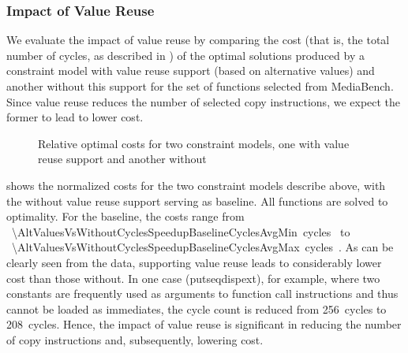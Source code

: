 \subsubsection{Impact of Value Reuse}

We evaluate the impact of \gls{value reuse} by comparing the cost (that is, the
total number of cycles, as described in ) of
the optimal \glspl{solution} produced by a \gls{constraint model} with
\gls{value reuse} support (based on \glspl{alternative value}) and another
without this support for the set of \glspl{function} selected from
\gls{MediaBench}.
%
Since \gls{value reuse} reduces the number of selected copy \glspl{instruction},
we expect the former to lead to lower cost.

\begin{figure}
  \centering%
  \maxsizebox{\textwidth}{!}{%
    \trimBarchartPlot{%
    }%
  }

  \caption[%
            Comparing optimal costs for constraint models with and without value
            reuse%
          ]%
          {%
            Relative optimal costs for two constraint models, one with value
            reuse support and another without%
          }
\end{figure}



 shows the normalized costs for the
two \glspl{constraint model} describe above, with the  without \gls{value reuse} support serving as \gls{baseline}.
%
All \glspl{function} are solved to optimality.
%
For the \gls{baseline}, the costs range from \mbox{%
  \num[round-precision=0]{\AltValuesVsWithoutCyclesSpeedupBaselineCyclesAvgMin}
  cycles%
} to \mbox{%
  \num[round-precision=0]{\AltValuesVsWithoutCyclesSpeedupBaselineCyclesAvgMax}
  cycles%
}.
%
As can be clearly seen from the data,  supporting
\gls{value reuse} leads to considerably lower cost than those without.
%
In one case ({\codeFont putseqdispext}), for example, where two constants are
frequently used as arguments to \gls{function} call \glspl{instruction} and thus
cannot be loaded as immediates, the cycle count is reduced from \num{256}~cycles
to \num{208}~cycles.
%
Hence, the impact of \gls{value reuse} is significant in reducing the number of
copy \glspl{instruction} and, subsequently, lowering cost.


